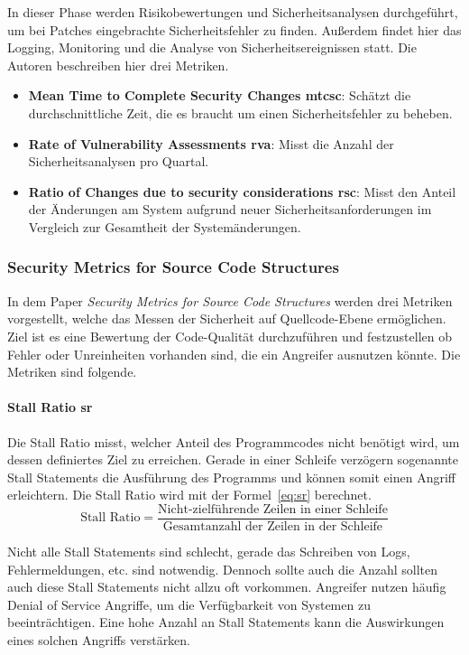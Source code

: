 \documentclass[12pt, a4paper, ngerman]{article}
\begin{document}
In dieser Phase werden Risikobewertungen und Sicherheitsanalysen durchgeführt, um bei Patches eingebrachte Sicherheitsfehler zu finden.
Außerdem findet hier das Logging, Monitoring und die Analyse von Sicherheitsereignissen statt.
Die Autoren beschreiben hier drei Metriken.
\begin{itemize}
  \item \textbf{Mean Time to Complete Security Changes \acs{mtcsc}}: Schätzt die durchschnittliche Zeit, die es braucht um einen Sicherheitsfehler zu beheben. 
  \item \textbf{Rate of Vulnerability Assessments \acs{rva}}: Misst die Anzahl der Sicherheitsanalysen pro Quartal.
  \item \textbf{Ratio of Changes due to security considerations \acs{rsc}}: Misst den Anteil der Änderungen am System aufgrund neuer Sicherheitsanforderungen im Vergleich zur Gesamtheit der Systemänderungen.
\end{itemize}

\subsubsection{Security Metrics for Source Code Structures~\cite{Chowdhury_Chan_Zulkernine_2008}}

In dem Paper \emph{Security Metrics for Source Code Structures} werden drei Metriken vorgestellt, 
welche das Messen der Sicherheit auf Quellcode-Ebene ermöglichen.
Ziel ist es eine Bewertung der Code-Qualität durchzuführen und 
festzustellen ob Fehler oder Unreinheiten vorhanden sind, die ein Angreifer ausnutzen könnte.
Die Metriken sind folgende.

\paragraph{Stall Ratio \acs{sr}}

Die Stall Ratio misst, welcher Anteil des Programmcodes nicht benötigt wird, um dessen definiertes Ziel zu erreichen.
Gerade in einer Schleife verzögern sogenannte Stall Statements die Ausführung des Programms und können somit einen Angriff erleichtern.
Die Stall Ratio wird mit der Formel~\ref{eq:sr} berechnet.
\begin{equation} \label{eq:sr}
  \text{Stall Ratio} = \frac{ \text{Nicht-zielführende Zeilen in einer Schleife} }{ \text{Gesamtanzahl der Zeilen in der Schleife} }
\end{equation}

Nicht alle Stall Statements sind schlecht, gerade das Schreiben von Logs, Fehlermeldungen, etc. sind notwendig.
Dennoch sollte auch die Anzahl sollten auch diese Stall Statements nicht allzu oft vorkommen.
Angreifer nutzen häufig Denial of Service Angriffe, um die Verfügbarkeit von Systemen zu beeinträchtigen.
Eine hohe Anzahl an Stall Statements kann die Auswirkungen eines solchen Angriffs verstärken.
\end{document}
